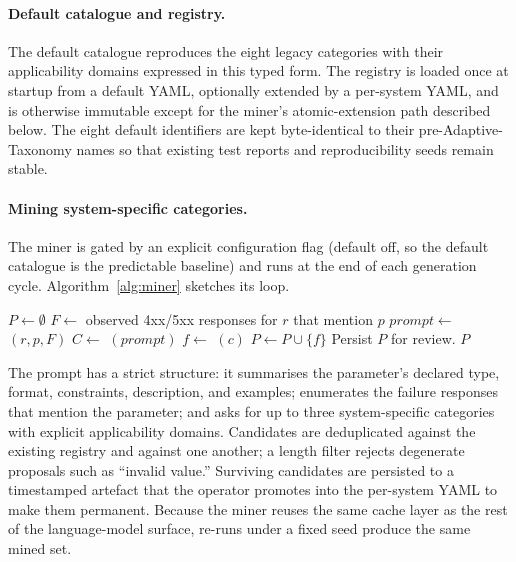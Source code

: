 \documentclass[conference]{IEEEtran}
\begin{document}
\paragraph{Default catalogue and registry.}
The default catalogue reproduces the eight legacy categories with their applicability domains expressed in this typed form. The registry is loaded once at startup from a default YAML, optionally extended by a per-system YAML, and is otherwise immutable except for the miner's atomic-extension path described below. The eight default identifiers are kept byte-identical to their pre-Adaptive-Taxonomy names so that existing test reports and reproducibility seeds remain stable.

\paragraph{Mining system-specific categories.}
The miner is gated by an explicit configuration flag (default off, so the default catalogue is the predictable baseline) and runs at the end of each generation cycle. Algorithm~\ref{alg:miner} sketches its loop.

\begin{algorithm}[t]
\caption{Mining system-specific fault categories.}\label{alg:miner}
\footnotesize
\begin{algorithmic}[1]
\Require{}
\Ensure{}
\State $P \gets \emptyset$
    \State $F \gets$ observed 4xx/5xx responses for $r$ that mention $p$
    \State $\mathit{prompt} \gets$ $(r, p, F)$
    \State $C \gets$ $(\mathit{prompt})$ 
      \State $f \gets$ $(c)$
        \State $P \gets P \cup \{f\}$
      \EndIf
    \EndFor
  \EndFor
\EndFor
\State Persist $P$ for review.
\State \Return $P$
\end{algorithmic}
\end{algorithm}

\noindent The prompt has a strict structure: it summarises the parameter's declared type, format, constraints, description, and examples; enumerates the failure responses that mention the parameter; and asks for up to three system-specific categories with explicit applicability domains. Candidates are deduplicated against the existing registry and against one another; a length filter rejects degenerate proposals such as ``invalid value.'' Surviving candidates are persisted to a timestamped artefact that the operator promotes into the per-system YAML to make them permanent. Because the miner reuses the same cache layer as the rest of the language-model surface, re-runs under a fixed seed produce the same mined set.
\end{document}
